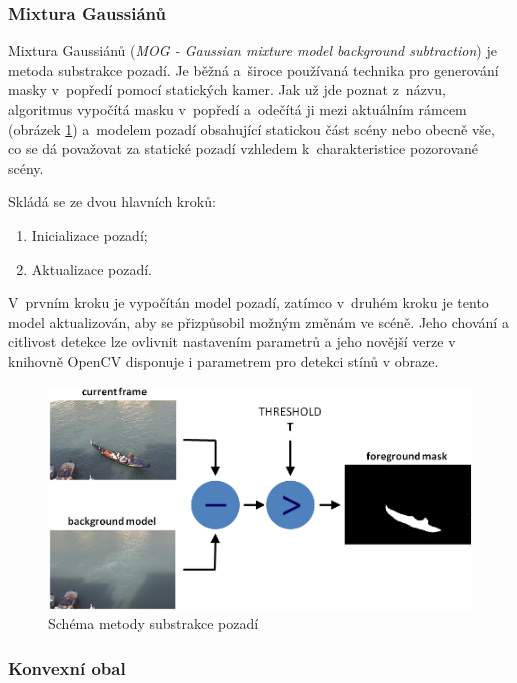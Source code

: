 \subsubsection{Mixtura Gaussiánů}

Mixtura Gaussiánů (\textit{MOG - Gaussian mixture model background subtraction}) \cite{mog:zivkovic} je metoda substrakce pozadí.  Je běžná a~široce používaná technika pro generování masky v~popředí pomocí statických kamer. Jak už jde poznat z~názvu, algoritmus vypočítá masku v~popředí a~odečítá ji mezi aktuálním rámcem (obrázek \ref{mog_scheme}) a~modelem pozadí obsahující statickou část scény nebo obecně vše, co se dá považovat za statické pozadí vzhledem k~charakteristice pozorované scény. 

Skládá se ze dvou hlavních kroků:
 \begin{enumerate}
    \item{Inicializace pozadí;}
    \item{Aktualizace pozadí.}
 \end{enumerate}
 V~prvním kroku je vypočítán model pozadí, zatímco v~druhém kroku je tento model aktualizován, aby se přizpůsobil možným změnám ve scéně. \cite{openCV:MOG}
Jeho chování a citlivost detekce lze ovlivnit nastavením parametrů a jeho novější verze v knihovně OpenCV disponuje i parametrem pro detekci stínů v obraze.
\begin{figure}[H]
  \centering
  \includegraphics[width=12cm]{figures/mog_scheme}
  \caption{Schéma metody substrakce pozadí \cite{openCV:MOG}}
  \label{mog_scheme}
\end{figure}


\subsubsection{Konvexní obal}

